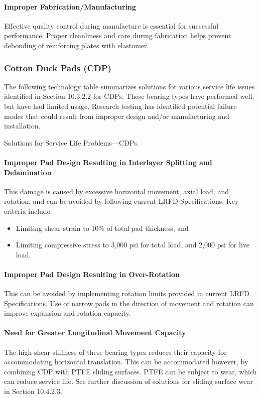 \paragraph{Improper Fabrication/Manufacturing}
Effective quality control during manufacture is essential for successful performance. Proper cleanliness and care
during fabrication helps prevent debonding of reinforcing plates with elastomer.

\subsubsection{Cotton Duck Pads (CDP)}
The following technology table summarizes solutions for various service life issues identified in Section 10.3.2.2
for CDPs. These bearing types have performed well, but have had limited usage. Research testing has identified
potential failure modes that could result from improper design and/or manufacturing and installation.

\begin{table}
  \caption{Solutions for Service Life Problems—CDPs.}
  \label{tab:solution-bearing-cdps}
\end{table}

\paragraph{Improper Pad Design Resulting in Interlayer Splitting and Delamination}
This damage is caused by excessive horizontal movement, axial load, and rotation, and can be avoided by
following current LRFD Specifications. Key criteria include:

\begin{itemize}
  \item Limiting shear strain to 10\% of total pad thickness, and
  \item Limiting compressive stress to 3,000 psi for total load, and 2,000 psi for live load.
\end{itemize}

\paragraph{Improper Pad Design Resulting in Over-Rotation}
This can be avoided by implementing rotation limits provided in current LRFD Specifications. Use of narrow
pads in the direction of movement and rotation can improve expansion and rotation capacity.

\paragraph{Need for Greater Longitudinal Movement Capacity}
The high shear stiffness of these bearing types reduces their capacity for accommodating horizontal translation.
This can be accommodated however, by combining CDP with PTFE sliding surfaces. PTFE can be subject to wear,
which can reduce service life. See further discussion of solutions for sliding surface wear in Section 10.4.2.3.

